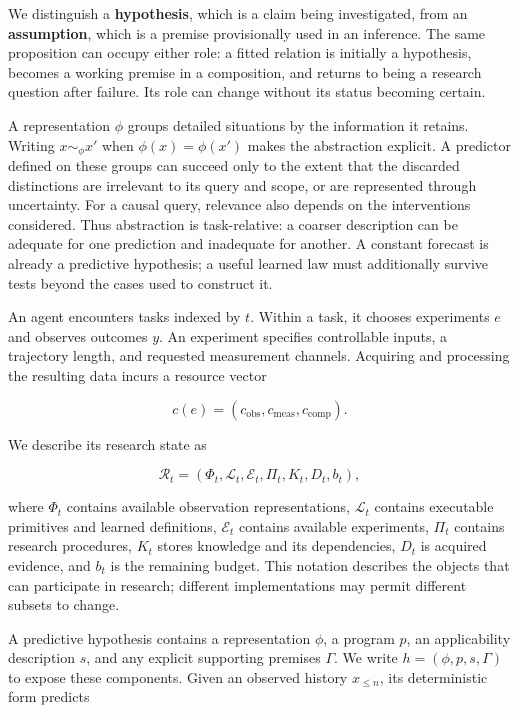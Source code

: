 \documentclass[11pt,a4paper]{article}
\begin{document}
We distinguish a \textbf{hypothesis}, which is a claim being investigated, from an \textbf{assumption}, which is a premise provisionally used in an inference. The same proposition can occupy either role: a fitted relation is initially a hypothesis, becomes a working premise in a composition, and returns to being a research question after failure. Its role can change without its status becoming certain.


A representation \(\phi\) groups detailed situations by the information it retains. Writing \(x\sim_\phi x'\) when \(\phi(x)=\phi(x')\) makes the abstraction explicit. A predictor defined on these groups can succeed only to the extent that the discarded distinctions are irrelevant to its query and scope, or are represented through uncertainty. For a causal query, relevance also depends on the interventions considered. Thus abstraction is task-relative: a coarser description can be adequate for one prediction and inadequate for another. A constant forecast is already a predictive hypothesis; a useful learned law must additionally survive tests beyond the cases used to construct it.


An agent encounters tasks indexed by \(t\). Within a task, it chooses experiments \(e\) and observes outcomes \(y\). An experiment specifies controllable inputs, a trajectory length, and requested measurement channels. Acquiring and processing the resulting data incurs a resource vector


\[
c(e)=(c_{\mathrm{obs}},c_{\mathrm{meas}},c_{\mathrm{comp}}).
\]


We describe its research state as


\[
\mathcal R_t=(\Phi_t,\mathcal L_t,\mathcal E_t,\Pi_t,K_t,D_t,b_t),
\]


where \(\Phi_t\) contains available observation representations, \(\mathcal L_t\) contains executable primitives and learned definitions, \(\mathcal E_t\) contains available experiments, \(\Pi_t\) contains research procedures, \(K_t\) stores knowledge and its dependencies, \(D_t\) is acquired evidence, and \(b_t\) is the remaining budget. This notation describes the objects that can participate in research; different implementations may permit different subsets to change.


A predictive hypothesis contains a representation \(\phi\), a program \(p\), an applicability description \(s\), and any explicit supporting premises \(\Gamma\). We write \(h=(\phi,p,s,\Gamma)\) to expose these components. Given an observed history \(x_{\leq n}\), its deterministic form predicts
\end{document}
